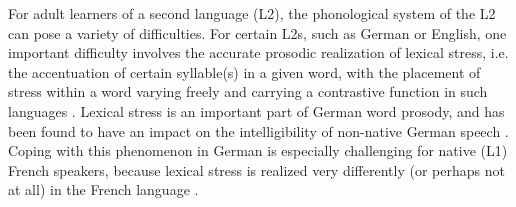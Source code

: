 \documentclass[a4paper]{article}
\begin{document}
    
  
  
  For adult learners of a second language (L2), the phonological system of the L2 can pose a variety of difficulties. For certain L2s, such as German or English, one important difficulty involves the accurate prosodic realization of lexical stress, i.e. the accentuation of certain syllable(s) in a given word, with the placement of stress within a word varying freely and carrying a contrastive function in such languages \cite{Cutler2005}. Lexical stress is an important part of German word prosody, and has been found to have an impact on the intelligibility of non-native German speech \cite{Hirschfeld1994}. Coping with this phenomenon in German is especially challenging for native (L1) French speakers, because lexical stress is realized very differently (or perhaps not at all) in the French language \cite{Michaux2013}. %
  
\end{document}
